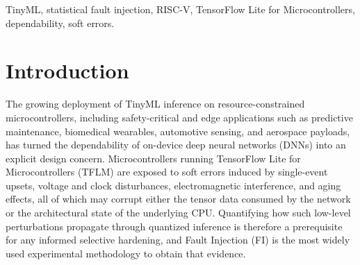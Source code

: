 \documentclass[conference]{IEEEtran}
\begin{document}
\begin{abstract}
    TinyML inference on resource-constrained microcontrollers has turned on-device DNN dependability into a critical concern for safety-critical and edge applications. Existing TinyML fault-injection approaches are either debug-interface-driven mechanisms that do not scale naturally to Statistical Fault Injection (SFI), or low-level runtime/on-device routines whose injectable population, sampling parameters, and campaign artifacts are not formally specified or preserved, so that SFI is not effectively performed. We present \textbf{RIFT-V}, an open-source, end-to-end Python campaign framework for TensorFlow Lite for Microcontrollers fault injection on real RISC-V microcontrollers, covering the full pipeline from declarative specification to firmware generation, automated execution, and analysis-ready classified outcomes, while elevating SFI to a \emph{first-class} campaign property. Validated on an ESP32-C6 with an INT8 LeNet-5 over MNIST, by applying formal SFI, RIFT-V cuts executed inferences by $\approx$63\% relative to the closest TinyML FI baseline for the same workload, while exposing actionable dependability information: tensor-memory faults are largely masked ($\approx$96.8\%), whereas architectural-register faults are substantially more disruptive ($\approx$52.4\% degrading rate) and frequently manifest as availability failures.
\end{abstract}



\begin{IEEEkeywords}
TinyML, statistical fault injection, RISC-V, TensorFlow Lite for Microcontrollers, dependability, soft errors.
\end{IEEEkeywords}

\section{Introduction}
\label{sec:introducao}

The growing deployment of TinyML inference on resource-constrained microcontrollers, including safety-critical and edge applications such as predictive maintenance, biomedical wearables, automotive sensing, and aerospace payloads, has turned the dependability of on-device deep neural networks (DNNs) into an explicit design concern. Microcontrollers running TensorFlow Lite for Microcontrollers (TFLM) are exposed to soft errors induced by single-event upsets, voltage and clock disturbances, electromagnetic interference, and aging effects, all of which may corrupt either the tensor data consumed by the network or the architectural state of the underlying CPU. Quantifying how such low-level perturbations propagate through quantized inference is therefore a prerequisite for any informed selective hardening, and Fault Injection (FI) is the most widely used experimental methodology to obtain that evidence.
 
\end{document}
